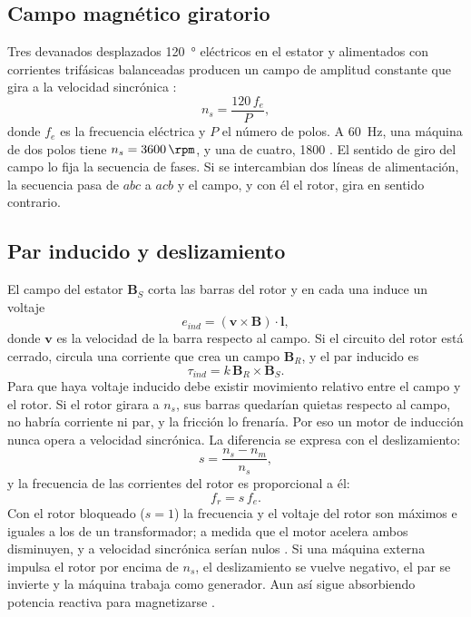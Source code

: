 \documentclass[conference]{IEEEtran}
\begin{document}
\subsection{Campo magnético giratorio}
Tres devanados desplazados \SI{120}{\degree} eléctricos en el estator y alimentados con corrientes trifásicas balanceadas producen un campo de amplitud constante que gira a la velocidad sincrónica \cite{chapman}:
\begin{equation}
n_s=\frac{120\,f_e}{P},
\label{eq:ns}
\end{equation}
donde $f_e$ es la frecuencia eléctrica y $P$ el número de polos. A \SI{60}{Hz}, una máquina de dos polos tiene $n_s=\SI{3600}{\rpm}$, y una de cuatro, \SI{1800}{\rpm} \cite{diapositivas}. El sentido de giro del campo lo fija la secuencia de fases. Si se intercambian dos líneas de alimentación, la secuencia pasa de $abc$ a $acb$ y el campo, y con él el rotor, gira en sentido contrario.

\subsection{Par inducido y deslizamiento}
El campo del estator $\mathbf{B}_S$ corta las barras del rotor y en cada una induce un voltaje \cite{diapositivas}
\begin{equation}
e_{ind}=(\mathbf{v}\times\mathbf{B})\cdot\mathbf{l},
\label{eq:eind}
\end{equation}
donde $\mathbf{v}$ es la velocidad de la barra respecto al campo. Si el circuito del rotor está cerrado, circula una corriente que crea un campo $\mathbf{B}_R$, y el par inducido es
\begin{equation}
\tau_{ind}=k\,\mathbf{B}_R\times\mathbf{B}_S .
\label{eq:tind}
\end{equation}
Para que haya voltaje inducido debe existir movimiento relativo entre el campo y el rotor. Si el rotor girara a $n_s$, sus barras quedarían quietas respecto al campo, no habría corriente ni par, y la fricción lo frenaría. Por eso un motor de inducción nunca opera a velocidad sincrónica. La diferencia se expresa con el deslizamiento:
\begin{equation}
s=\frac{n_s-n_m}{n_s},
\label{eq:s}
\end{equation}
y la frecuencia de las corrientes del rotor es proporcional a él:
\begin{equation}
f_r=s\,f_e .
\label{eq:fr}
\end{equation}
Con el rotor bloqueado ($s=1$) la frecuencia y el voltaje del rotor son máximos e iguales a los de un transformador; a medida que el motor acelera ambos disminuyen, y a velocidad sincrónica serían nulos \cite{diapositivas}. Si una máquina externa impulsa el rotor por encima de $n_s$, el deslizamiento se vuelve negativo, el par se invierte y la máquina trabaja como generador. Aun así sigue absorbiendo potencia reactiva para magnetizarse \cite{generador}.
\end{document}
